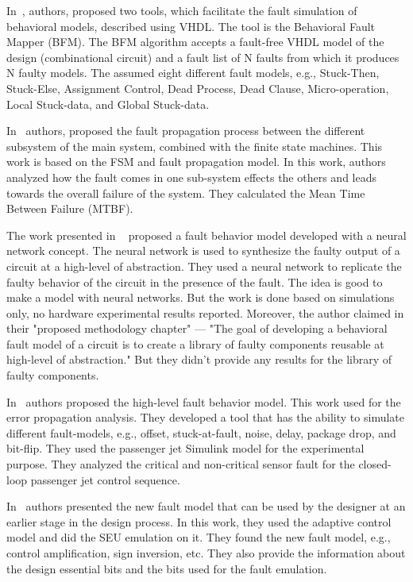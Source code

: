 In~\citep{hayne1999behavioral}, authors, proposed two tools, which facilitate the fault simulation of behavioral
models, described using VHDL. The tool is the Behavioral Fault Mapper (BFM). The BFM algorithm
accepts a fault-free VHDL model of the design (combinational circuit) and a fault list of N faults from
which it produces N faulty models. The assumed eight different fault models, e.g., Stuck-Then, Stuck-Else,
Assignment Control, Dead Process, Dead Clause, Micro-operation, Local Stuck-data, and Global Stuck-data. 

In~\citep{chen2017fault} authors, proposed the fault propagation process between the different subsystem of the
main system, combined with the finite state machines. This work is based on the FSM and fault propagation model. In this work, authors analyzed how the fault comes in one sub-system effects the others and leads towards the overall failure of the system. They calculated the Mean Time Between Failure (MTBF).


The work presented in ~\citep{mirzadeh2014modeling} proposed a fault behavior model developed with a neural network
concept. The neural network is used to synthesize the faulty output of a
circuit at a high-level of abstraction. They used a neural network to replicate the faulty behavior of the circuit in the presence of the fault. The idea is good to make a model with neural networks. But the work is done based on simulations only, no hardware experimental results reported. Moreover, the author claimed in their "proposed methodology chapter"  --- "The goal of developing a behavioral fault model of a circuit is to create a library of faulty components reusable at high-level of abstraction." But they didn't provide any results for the library of faulty components.


In~\citep{janschek2017errorsim} authors proposed the high-level fault behavior model. This work used for the error propagation analysis. They developed a tool that has the ability to simulate different fault-models, e.g., offset, stuck-at-fault, noise, delay, package drop, and bit-flip. They used the passenger jet Simulink model for the experimental purpose. They analyzed the critical and non-critical sensor fault for the closed-loop passenger jet control sequence.

In~\citep{hobeika2013flight} authors presented the new fault model that can be used by the designer at an earlier stage in the design process. In this work, they used the adaptive control model and did the SEU emulation on it. They found the new fault model, e.g., control amplification, sign inversion, etc. They also provide the information about the design essential bits and the bits used for the fault emulation.

